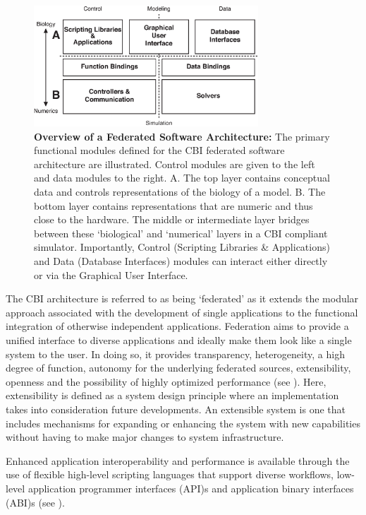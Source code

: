 \documentclass[10pt,letterpaper]{article}
\begin{document}
\begin{figure}[ht]
\begin{center}
\includegraphics[width=0.75\textwidth]{figures/cbi-architecture-simple.eps}
\end{center}
\caption{ \small{\bf Overview of a Federated Software Architecture:}
  The primary functional modules defined for the CBI federated software architecture are illustrated.  Control modules are given to the left and data modules to the right.  A. The top layer contains conceptual data and controls representations of the biology of a model. B. The bottom layer contains representations that are
  numeric and thus close to the hardware.  The middle or intermediate layer bridges between these `biological' and `numerical' layers in a CBI compliant simulator. Importantly, Control (Scripting Libraries \& Applications) and Data (Database Interfaces) modules can interact either directly or via the Graphical User Interface. }
\label{fig7}
\end{figure}

The CBI architecture is referred to as being `federated' as it extends the modular approach associated with the development of single applications to the functional integration of otherwise independent applications. Federation aims to provide a unified interface to diverse applications and ideally make them look like a single
system to the user. In doing so, it provides transparency, heterogeneity, a high degree of function, autonomy for the underlying federated sources, extensibility, openness and the possibility of highly optimized performance (see \cite{federated-2002-xyz}). Here, extensibility is defined as a system design principle where an implementation takes into consideration future developments. An extensible system is one that includes mechanisms for expanding or enhancing the system with new capabilities without having to make major changes to system infrastructure. 

Enhanced application interoperability and performance is available through the use of flexible high-level scripting languages that support diverse workflows, low-level application programmer interfaces (API)s and application binary interfaces (ABI)s (see \cite{Cornelis:2011fk}).
\end{document}
